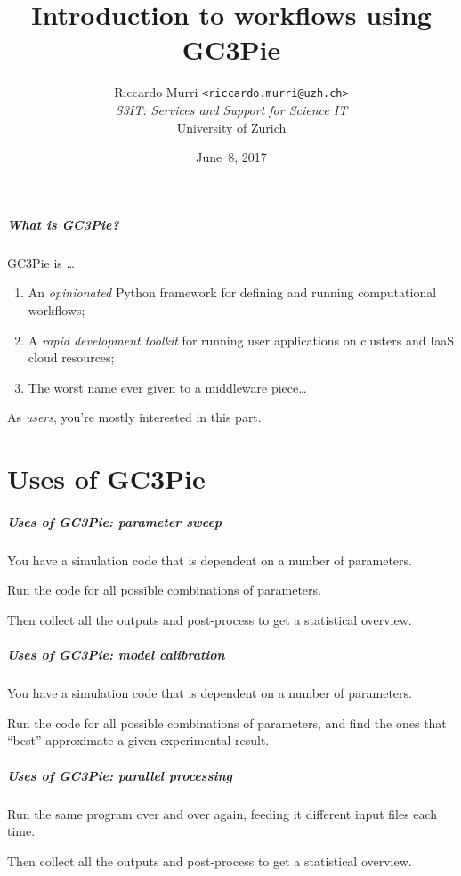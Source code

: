 \documentclass[english,serif,mathserif,xcolor=pdftex,dvipsnames,table]{beamer}
\title[10. Workflows]{%
  Introduction to workflows
  using GC3Pie
}
\author[R.~Murri]{%
  Riccardo Murri \texttt{<riccardo.murri@uzh.ch>}
  \\
  {\em S3IT: Services and Support for Science IT}
  \\
  University of Zurich
}
\date{June~8, 2017}
\begin{document}
\maketitle

\begin{frame}
  \frametitle{What is GC3Pie?}
  GC3Pie is \ldots
  \begin{enumerate}
  \item An \emph{opinionated} Python framework for defining and running computational workflows;
  \item \alert<2>{A \emph{rapid development toolkit} for running user applications on clusters and IaaS cloud resources;}
  \item The worst name ever given to a middleware piece\ldots
  \end{enumerate}

  \+
  As \emph{users}, \alert<2>{you're mostly interested in this part.}
\end{frame}


\part{Uses of GC3Pie}

\begin{frame}[fragile]
  \frametitle{Uses of GC3Pie: parameter sweep}

  You have a simulation code that is dependent on a number of parameters.

  \+
  Run the code for all possible combinations of parameters.

  \+
  Then collect all the outputs and post-process to get a
  statistical overview.
\end{frame}


\begin{frame}[fragile]
  \frametitle{Uses of GC3Pie: model calibration}

  You have a simulation code that is dependent on a number of parameters.

  \+
  Run the code for all possible combinations of parameters, and
  find the ones that ``best'' approximate a given experimental result.
\end{frame}


\begin{frame}[fragile]
  \frametitle{Uses of GC3Pie: parallel processing}

  Run the same program over and over again,
  feeding it different input files each time.

  \+
  Then collect all the outputs and post-process to get a
  statistical overview.
\end{frame}
\end{document}
